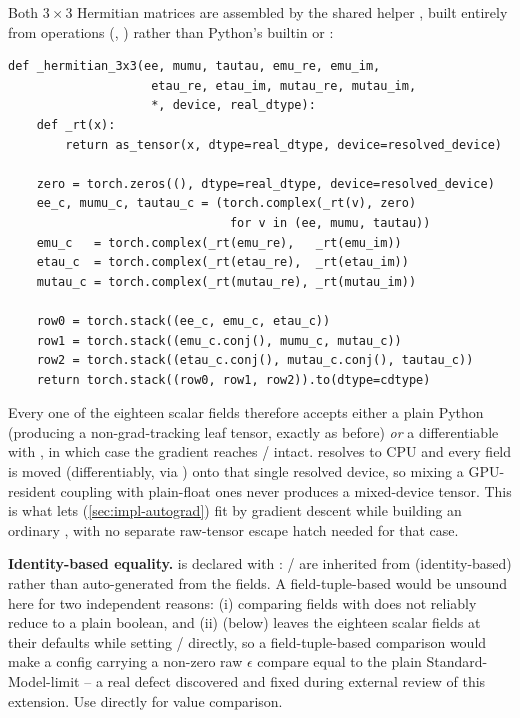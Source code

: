 \begin{implbox}[title={Differentiable tensor construction}]
Both $3\times3$ Hermitian matrices are assembled by the shared helper
, built entirely from  operations
(, ) rather than Python's
 builtin or :
\begin{lstlisting}[style=tpython]
def _hermitian_3x3(ee, mumu, tautau, emu_re, emu_im,
                    etau_re, etau_im, mutau_re, mutau_im,
                    *, device, real_dtype):
    def _rt(x):
        return as_tensor(x, dtype=real_dtype, device=resolved_device)

    zero = torch.zeros((), dtype=real_dtype, device=resolved_device)
    ee_c, mumu_c, tautau_c = (torch.complex(_rt(v), zero)
                               for v in (ee, mumu, tautau))
    emu_c   = torch.complex(_rt(emu_re),   _rt(emu_im))
    etau_c  = torch.complex(_rt(etau_re),  _rt(etau_im))
    mutau_c = torch.complex(_rt(mutau_re), _rt(mutau_im))

    row0 = torch.stack((ee_c, emu_c, etau_c))
    row1 = torch.stack((emu_c.conj(), mumu_c, mutau_c))
    row2 = torch.stack((etau_c.conj(), mutau_c.conj(), tautau_c))
    return torch.stack((row0, row1, row2)).to(dtype=cdtype)
\end{lstlisting}
Every one of the eighteen scalar fields therefore accepts either a plain
Python  (producing a non-grad-tracking leaf tensor, exactly as
before) \emph{or} a differentiable  with
, in which case the gradient reaches
/ intact.  resolves to
CPU and every field is moved (differentiably, via ) onto that
single resolved device, so mixing a GPU-resident coupling with plain-float
ones never produces a mixed-device tensor. This is what lets
(\cref{sec:impl-autograd}) fit  by gradient descent while
building an ordinary , with no separate raw-tensor
escape hatch needed for that case.
\end{implbox}

\begin{notebox}
\textbf{Identity-based equality.}  is declared with
: /
are inherited from  (identity-based) rather than
auto-generated from the fields. A field-tuple-based  would
be unsound here for two independent reasons: (i) comparing
 fields with \code{==} does not reliably reduce to a
plain boolean, and (ii) 
(below) leaves the eighteen scalar fields at their  defaults
while setting / directly, so a
field-tuple-based comparison would make a config carrying a non-zero raw
$\epsilon$ compare equal to the plain Standard-Model-limit
 -- a real defect discovered and fixed during
external review of this extension. Use
 directly for value comparison.
\end{notebox}

